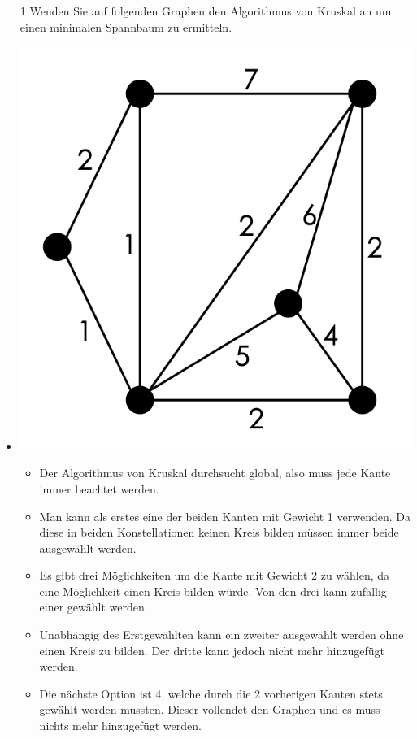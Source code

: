 \documentclass{article}
\begin{document}
	\begin{itemize}
		\item[1]{Wenden Sie auf folgenden Graphen den Algorithmus von Kruskal an um einen minimalen Spannbaum zu ermitteln.}
		\item{\includegraphics{Bilder/graph_1.png}
		\begin{itemize}
			\item{Der Algorithmus von Kruskal durchsucht global, also muss jede Kante immer beachtet werden.}
			\item{Man kann als erstes eine der beiden Kanten mit Gewicht 1 verwenden. Da diese in beiden Konstellationen keinen Kreis bilden müssen immer beide ausgewählt werden.}
			\item{Es gibt drei Möglichkeiten um die Kante mit Gewicht 2 zu wählen, da eine Möglichkeit einen Kreis bilden würde. Von den drei kann zufällig einer gewählt werden.}
			\item{Unabhängig des Erstgewählten kann ein zweiter ausgewählt werden ohne einen Kreis zu bilden. Der dritte kann jedoch nicht mehr hinzugefügt werden.}
			\item{Die nächste Option ist 4, welche durch die 2 vorherigen Kanten stets gewählt werden mussten. Dieser vollendet den Graphen und es muss nichts mehr hinzugefügt werden.}
		\end{itemize}
}
\end{itemize}
\end{document}
